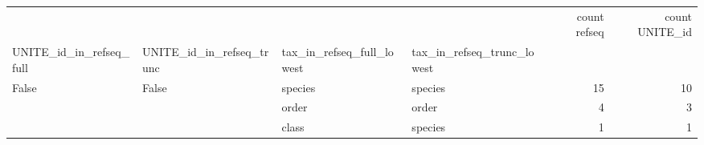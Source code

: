 \begin{tabular}{llllrr}
\toprule
 &  &  &  & count refseq & count UNITE\_id \\
UNITE_id_in_refseq_full & UNITE_id_in_refseq_trunc & tax_in_refseq_full_lowest & tax_in_refseq_trunc_lowest &  &  \\
\midrule
\multirow[t]{3}{*}{False} & \multirow[t]{3}{*}{False} & species & species & 15 & 10 \\
\cline{3-6}
 &  & order & order & 4 & 3 \\
\cline{3-6}
 &  & class & species & 1 & 1 \\
\cline{1-6} \cline{2-6} \cline{3-6}
\bottomrule
\end{tabular}

